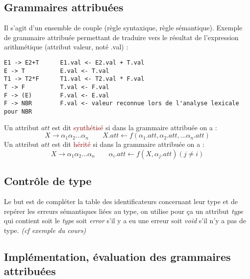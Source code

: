 \documentclass{article}
\newcommand{\red}[1]{\textcolor{darkred}{#1}}
\begin{document}
\subsection{Grammaires attribuées}

Il s'agit d'un ensemble de couple (règle syntaxique, règle sémantique). Exemple de grammaire attribuée permettant de traduire vers le résultat de l'expression arithmétique 
(attribut valeur, noté .val) :
\begin{verbatim}
E1 -> E2+T      E1.val <- E2.val + T.val
E -> T          E.val <- T.val
T1 -> T2*F      T1.val <- T2.val * F.val
T -> F          T.val <- F.val
F -> (E)        F.val <- E.val
F -> NBR        F.val <- valeur reconnue lors de l'analyse lexicale pour NBR
\end{verbatim}

\noindent Un attribut $att$ est dit \red{synthétisé} si dans la grammaire attribuée on a : 
\[ X\rightarrow \alpha_1\alpha_2 ... \alpha_n \qquad X.att \leftarrow f(\alpha_1.att, \alpha_2.att,...\alpha_n.att)\]
\noindent Un attribut $att$ est dit \red{hérité} si dans la grammaire attribuée on a :
\[ X\rightarrow \alpha_1\alpha_2 ... \alpha_n \qquad \alpha_i.att \leftarrow f(X,\alpha_j.att) (j \neq i) \]
\newpage
\subsection{Contrôle de type}

Le but est de compléter la table des identificateurs concernant leur type et de repérer les erreurs sémantiques liées au type, on utilise pour ça un attribut \textit{type} qui 
contient soit le \textit{type} soit \textit{error} s'il y a eu une erreur soit \textit{void} s'il n'y a pas de type. \textit{(cf exemple du cours)}

\subsection{Implémentation, évaluation des grammaires attribuées}
\end{document}
